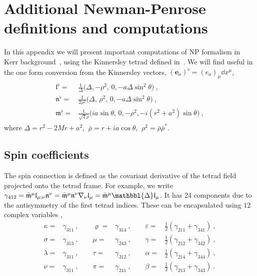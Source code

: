 
\chapter{Additional Newman-Penrose definitions and computations} %
\label{AppendixNPFormalism}

In this appendix we will present important computations of NP formalism in Kerr background~, using the Kinnersley tetrad defined in~.
We will find useful in the one form conversion from the Kinnersley vectors, $(\bm{e}_a)^\flat = (e_a)_\mu \dd x^\mu$,
\begin{align}
    \begin{split}
        \bm{\mathfrak{l}}^\flat =& \frac{1}{\Delta} \Bigr(\Delta, -\rho^2, \,0, -a \Delta \sin^2\theta \Bigr) ~, \\
        \bm{\mathfrak{n}}^\flat =& \frac{1}{2 \rho^2} \Bigr(\Delta, \,\rho^2, \,0, -a \Delta \sin^2\theta \Bigr) ~, \\
        \bm{\mathfrak{m}}^\flat =& \frac{1}{ \sqrt{2} \bar{\rho} } \Bigr( i a \sin\theta, \,0, -\rho^2, - i (r^2+a^2) \sin\theta \Bigr) ~,
    \end{split}
\end{align}
where $\Delta=r^2-2 M r + a^2$, $~\bar{\rho} = r + i a \cos\theta$, $~\rho^2 = \bar{\rho} \bar{\rho}^*$.

\section{Spin coefficients}
\label{AppendixNPSpinCoef}

The spin connection is defined as the covariant derivative of the tetrad field projected onto the tetrad frame. 
For example, we write $\gamma_{412} = \bar{\mathfrak{m}}^\mu \mathfrak{l}_{\mu;\nu} \mathfrak{n}^\nu =  \bar{\mathfrak{m}}^\mu \mathfrak{n}^\nu \nabla_\nu \mathfrak{l}_{\mu} = \bar{\mathfrak{m}}^\mu \mathbbl{\Delta} \mathfrak{l}_\mu$.
It has $24$ components due to the antisymmetry of the first tetrad indices. These can be encapsulated using $12$ complex variables \cite{Chandrasekhar1998},
\begin{equation}
    \begin{alignedat}{4}
        \kappa  =& \gamma_{311} ~,\qquad \varrho =& \gamma_{314} ~,\qquad \varepsilon =& \tfrac{1}{2} (\gamma_{211} + \gamma_{341}) ~, \\
        \sigma  =& \gamma_{313} ~,\qquad \mu     =& \gamma_{243} ~,\qquad \gamma      =& \tfrac{1}{2} (\gamma_{212} + \gamma_{342}) ~, \\
        \lambda =& \gamma_{311} ~,\qquad \tau    =& \gamma_{312} ~,\qquad \alpha      =& \tfrac{1}{2} (\gamma_{214} + \gamma_{344}) ~, \\
        \nu     =& \gamma_{311} ~,\qquad \pi     =& \gamma_{241} ~,\qquad \beta       =& \tfrac{1}{2} (\gamma_{213} + \gamma_{343}) ~.
    \end{alignedat}
\end{equation}

